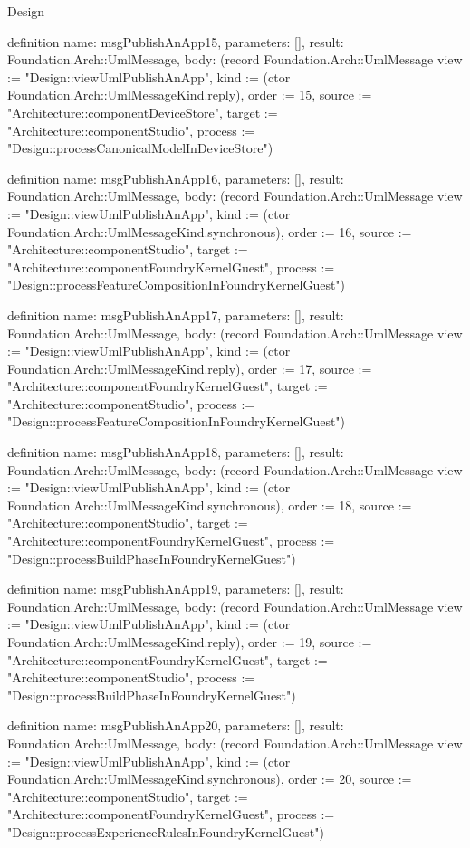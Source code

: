 \begin{lexlean}{Design}
\begin{semanticmodule}
definition{
  name: msgPublishAnApp15,
  parameters: [],
  result: Foundation.Arch::UmlMessage,
  body: (record Foundation.Arch::UmlMessage {view := "Design::viewUmlPublishAnApp", kind := (ctor Foundation.Arch::UmlMessageKind.reply), order := 15, source := "Architecture::componentDeviceStore", target := "Architecture::componentStudio", process := "Design::processCanonicalModelInDeviceStore"})
}

definition{
  name: msgPublishAnApp16,
  parameters: [],
  result: Foundation.Arch::UmlMessage,
  body: (record Foundation.Arch::UmlMessage {view := "Design::viewUmlPublishAnApp", kind := (ctor Foundation.Arch::UmlMessageKind.synchronous), order := 16, source := "Architecture::componentStudio", target := "Architecture::componentFoundryKernelGuest", process := "Design::processFeatureCompositionInFoundryKernelGuest"})
}

definition{
  name: msgPublishAnApp17,
  parameters: [],
  result: Foundation.Arch::UmlMessage,
  body: (record Foundation.Arch::UmlMessage {view := "Design::viewUmlPublishAnApp", kind := (ctor Foundation.Arch::UmlMessageKind.reply), order := 17, source := "Architecture::componentFoundryKernelGuest", target := "Architecture::componentStudio", process := "Design::processFeatureCompositionInFoundryKernelGuest"})
}

definition{
  name: msgPublishAnApp18,
  parameters: [],
  result: Foundation.Arch::UmlMessage,
  body: (record Foundation.Arch::UmlMessage {view := "Design::viewUmlPublishAnApp", kind := (ctor Foundation.Arch::UmlMessageKind.synchronous), order := 18, source := "Architecture::componentStudio", target := "Architecture::componentFoundryKernelGuest", process := "Design::processBuildPhaseInFoundryKernelGuest"})
}

definition{
  name: msgPublishAnApp19,
  parameters: [],
  result: Foundation.Arch::UmlMessage,
  body: (record Foundation.Arch::UmlMessage {view := "Design::viewUmlPublishAnApp", kind := (ctor Foundation.Arch::UmlMessageKind.reply), order := 19, source := "Architecture::componentFoundryKernelGuest", target := "Architecture::componentStudio", process := "Design::processBuildPhaseInFoundryKernelGuest"})
}

definition{
  name: msgPublishAnApp20,
  parameters: [],
  result: Foundation.Arch::UmlMessage,
  body: (record Foundation.Arch::UmlMessage {view := "Design::viewUmlPublishAnApp", kind := (ctor Foundation.Arch::UmlMessageKind.synchronous), order := 20, source := "Architecture::componentStudio", target := "Architecture::componentFoundryKernelGuest", process := "Design::processExperienceRulesInFoundryKernelGuest"})
}


\end{semanticmodule}
\end{lexlean}
